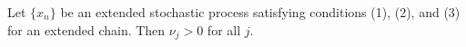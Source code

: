 Let $\{x_n\}$ be an extended stochastic process satisfying conditions (1), (2), and (3) for an extended chain. Then $\nu_j > 0$ for all $j$.
